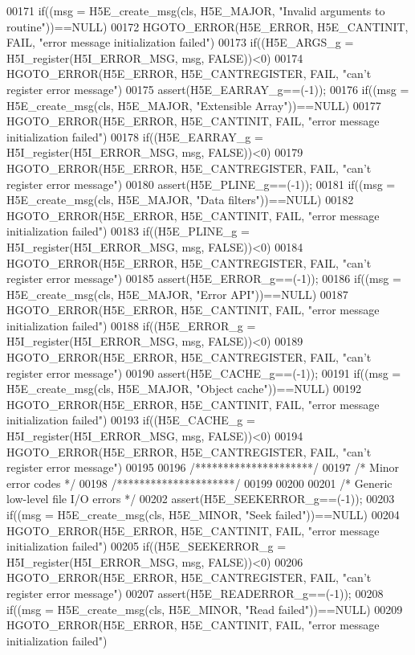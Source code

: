\begin{DoxyCode}
00171 if((msg = H5E\_create\_msg(cls, H5E\_MAJOR, "Invalid arguments to routine"))==NULL)
00172     HGOTO\_ERROR(H5E\_ERROR, H5E\_CANTINIT, FAIL, "error message initialization failed")
00173 if((H5E\_ARGS\_g = H5I\_register(H5I\_ERROR\_MSG, msg, FALSE))<0)
00174     HGOTO\_ERROR(H5E\_ERROR, H5E\_CANTREGISTER, FAIL, "can't register error message")
00175 assert(H5E\_EARRAY\_g==(-1));
00176 if((msg = H5E\_create\_msg(cls, H5E\_MAJOR, "Extensible Array"))==NULL)
00177     HGOTO\_ERROR(H5E\_ERROR, H5E\_CANTINIT, FAIL, "error message initialization failed")
00178 if((H5E\_EARRAY\_g = H5I\_register(H5I\_ERROR\_MSG, msg, FALSE))<0)
00179     HGOTO\_ERROR(H5E\_ERROR, H5E\_CANTREGISTER, FAIL, "can't register error message")
00180 assert(H5E\_PLINE\_g==(-1));
00181 if((msg = H5E\_create\_msg(cls, H5E\_MAJOR, "Data filters"))==NULL)
00182     HGOTO\_ERROR(H5E\_ERROR, H5E\_CANTINIT, FAIL, "error message initialization failed")
00183 if((H5E\_PLINE\_g = H5I\_register(H5I\_ERROR\_MSG, msg, FALSE))<0)
00184     HGOTO\_ERROR(H5E\_ERROR, H5E\_CANTREGISTER, FAIL, "can't register error message")
00185 assert(H5E\_ERROR\_g==(-1));
00186 if((msg = H5E\_create\_msg(cls, H5E\_MAJOR, "Error API"))==NULL)
00187     HGOTO\_ERROR(H5E\_ERROR, H5E\_CANTINIT, FAIL, "error message initialization failed")
00188 if((H5E\_ERROR\_g = H5I\_register(H5I\_ERROR\_MSG, msg, FALSE))<0)
00189     HGOTO\_ERROR(H5E\_ERROR, H5E\_CANTREGISTER, FAIL, "can't register error message")
00190 assert(H5E\_CACHE\_g==(-1));
00191 if((msg = H5E\_create\_msg(cls, H5E\_MAJOR, "Object cache"))==NULL)
00192     HGOTO\_ERROR(H5E\_ERROR, H5E\_CANTINIT, FAIL, "error message initialization failed")
00193 if((H5E\_CACHE\_g = H5I\_register(H5I\_ERROR\_MSG, msg, FALSE))<0)
00194     HGOTO\_ERROR(H5E\_ERROR, H5E\_CANTREGISTER, FAIL, "can't register error message")
00195 
00196 \textcolor{comment}{/*********************/}
00197 \textcolor{comment}{/* Minor error codes */}
00198 \textcolor{comment}{/*********************/}
00199 
00200 
00201 \textcolor{comment}{/* Generic low-level file I/O errors */}
00202 assert(H5E\_SEEKERROR\_g==(-1));
00203 if((msg = H5E\_create\_msg(cls, H5E\_MINOR, "Seek failed"))==NULL)
00204     HGOTO\_ERROR(H5E\_ERROR, H5E\_CANTINIT, FAIL, "error message initialization failed")
00205 if((H5E\_SEEKERROR\_g = H5I\_register(H5I\_ERROR\_MSG, msg, FALSE))<0)
00206     HGOTO\_ERROR(H5E\_ERROR, H5E\_CANTREGISTER, FAIL, "can't register error message")
00207 assert(H5E\_READERROR\_g==(-1));
00208 if((msg = H5E\_create\_msg(cls, H5E\_MINOR, "Read failed"))==NULL)
00209     HGOTO\_ERROR(H5E\_ERROR, H5E\_CANTINIT, FAIL, "error message initialization failed")

\end{DoxyCode}
